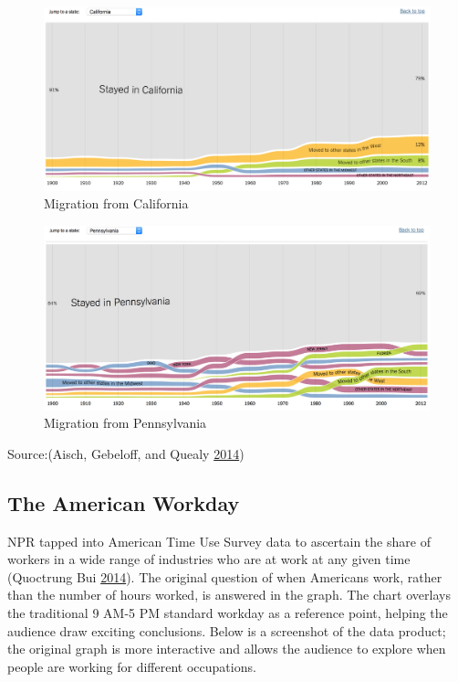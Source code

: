 \documentclass[]{book}
\begin{document}
\begin{figure}
\centering
\includegraphics{images/CA_migration.png}
\caption{Migration from California}
\end{figure}

\begin{figure}
\centering
\includegraphics{images/PA_migration.png}
\caption{Migration from Pennsylvania}
\end{figure}

Source:(Aisch, Gebeloff, and Quealy \protect\hyperlink{ref-migration}{2014})

\hypertarget{the-american-workday}{%
\subsection{The American Workday}\label{the-american-workday}}

NPR tapped into American Time Use Survey data to ascertain the share of workers in a wide range of industries who are at work at any given time (Quoctrung Bui \protect\hyperlink{ref-NPR_workday}{2014}). The original question of when Americans work, rather than the number of hours worked, is answered in the graph. The chart overlays the traditional 9 AM-5 PM standard workday as a reference point, helping the audience draw exciting conclusions. Below is a screenshot of the data product; the original graph is more interactive and allows the audience to explore when people are working for different occupations.
\end{document}

